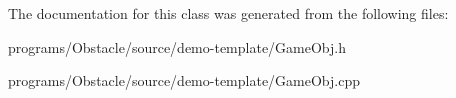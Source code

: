 The documentation for this class was generated from the following files\+:\begin{DoxyCompactItemize}
\item 
programs/\+Obstacle/source/demo-\/template/Game\+Obj.\+h\item 
programs/\+Obstacle/source/demo-\/template/Game\+Obj.\+cpp\end{DoxyCompactItemize}
